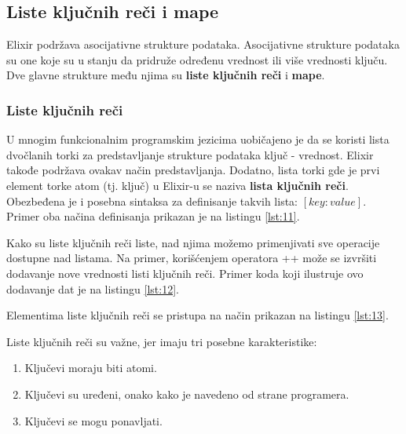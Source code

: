 \documentclass[12pt,oneside]{memoir}
\begin{document}
\subsection{Liste ključnih reči i mape}
\label{odeljak:ključneReči}
Elixir podržava asocijativne strukture podataka. Asocijativne strukture podataka su one koje su u stanju da pridruže određenu vrednost ili više vrednosti ključu. Dve glavne strukture među njima su \textbf{liste ključnih reči} i \textbf{mape}.

\subsubsection{Liste ključnih reči}
U mnogim funkcionalnim programskim jezicima uobičajeno je da se koristi lista dvočlanih torki za predstavljanje strukture podataka ključ - vrednost. Elixir takođe podržava ovakav način predstavljanja. Dodatno, lista torki gde je prvi element torke atom (tj. ključ) u Elixir-u se naziva \textbf{lista ključnih reči}. Obezbeđena je i posebna sintaksa za definisanje takvih lista: $[key: value]$. Primer oba načina definisanja prikazan je na listingu \ref{lst:11}.



Kako su liste ključnih reči liste, nad njima možemo primenjivati sve operacije dostupne nad listama. Na primer, korišćenjem operatora ++ može se izvršiti dodavanje nove vrednosti listi ključnih reči. Primer koda koji ilustruje ovo dodavanje dat je na listingu \ref{lst:12}.



Elementima liste ključnih reči se pristupa na način prikazan na listingu \ref{lst:13}.



Liste ključnih reči su važne, jer imaju tri posebne karakteristike:
\begin{enumerate}
\itemsep0em 
\item{Ključevi moraju biti atomi.}
\item{Ključevi su uređeni, onako kako je navedeno od strane programera.}
\item{Ključevi se mogu ponavljati.}
\end{enumerate}
\end{document}
